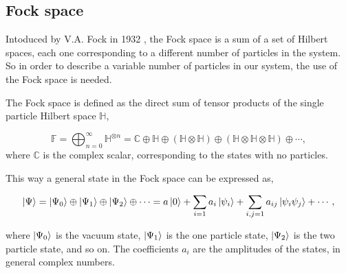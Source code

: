 \documentclass[11pt,a4paper,twoside,pdf]{article}
\numberwithin{equation}{section}
\begin{document}
\subsection{Fock space} \label{sec:fock_space}

Intoduced by V.A. Fock in 1932 \cite{1932ZPhy...75..622F}, the Fock space is a sum 
of a set of Hilbert spaces, each one corresponding to a different number of 
particles in the system. So in order to describe a variable number of particles in our 
system, the use of the Fock space is needed.

The Fock space is defined as the direct sum of tensor products of the single 
particle Hilbert space $\mathbb{H}$,

\begin{equation}
    \mathbb{F} = \bigoplus_{n=0}^{\infty}  \mathbb{H}^{\otimes n} = 
    \mathbb{C} \oplus \mathbb{H} \oplus (\mathbb{H} \otimes \mathbb{H}) 
    \oplus (\mathbb{H} \otimes \mathbb{H}\otimes \mathbb{H}) \oplus \cdots,
\end{equation}
where $\mathbb{C}$ is the complex scalar, corresponding to the states with no particles.

This way a general state in the Fock space can be expressed as,

\begin{equation}
    \ket{\Psi} = \ket{\Psi_0} \oplus \ket{\Psi_1} \oplus
    \ket{\Psi_2} \oplus \cdots = a \ket{0} + \sum_{i=1}a_i \ket{\psi_i} +
    \sum_{i,j=1}a_{ij} \ket{\psi_i \psi_j} + \cdots,
\end{equation}

where $\ket{\Psi_0}$ is the vacuum state, $\ket{\Psi_1}$ is the one particle
state, $\ket{\Psi_2}$ is the two particle state, and so on. The coefficients $a_i$
are the amplitudes of the states, in general complex numbers. 
\end{document}
